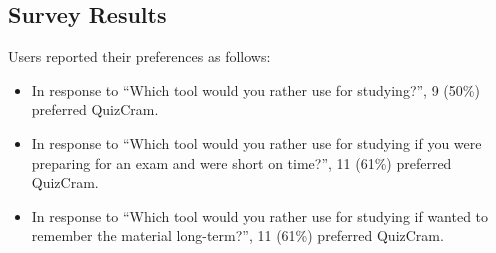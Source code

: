 \documentclass{chi-ext}
\begin{document}

\subsection{Survey Results}

Users reported their preferences as follows:

\begin{itemize}
\item In response to ``Which tool would you rather use for studying?'', 9 (50\%) preferred QuizCram.
\item In response to ``Which tool would you rather use for studying if you were preparing for an exam and were short on time?'', 11 (61\%) preferred QuizCram.
\item In response to ``Which tool would you rather use for studying if wanted to remember the material long-term?'', 11 (61\%) preferred QuizCram.
\end{itemize}



\end{document}
